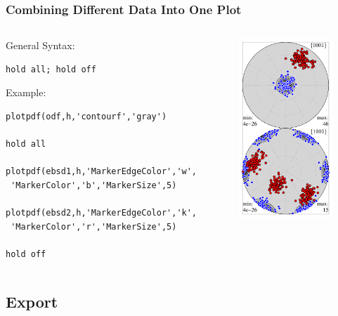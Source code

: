 \documentclass{beamer}
\begin{document}
\begin{frame}[fragile]
  \frametitle{Combining Different Data Into One Plot}
  
  \begin{columns}
    \begin{column}{8.7cm}
      
      General Syntax:%
\begin{lstlisting}
hold all; hold off
\end{lstlisting}

    Example:
\begin{lstlisting}
plotpdf(odf,h,'contourf','gray')

hold all

plotpdf(ebsd1,h,'MarkerEdgeColor','w',
 'MarkerColor','b','MarkerSize',5)

plotpdf(ebsd2,h,'MarkerEdgeColor','k',
 'MarkerColor','r','MarkerSize',5)

hold off
\end{lstlisting}


    \end{column}
    
    \begin{column}{3.5cm}
      \includegraphics[width=3.5cm]{pic/combined}%
    \end{column}
  \end{columns}

\end{frame}

\subsection*{Export}
\end{document}
